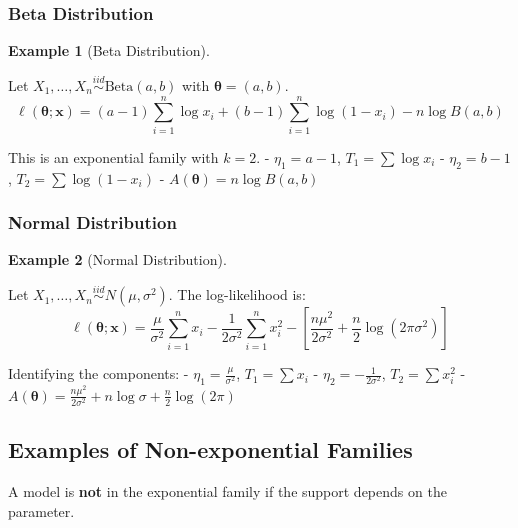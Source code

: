 \documentclass[
  letterpaper,
  DIV=11,
  numbers=noendperiod]{scrreprt}
\renewcommand{\[}{\begin{equation}}
\renewcommand{\]}{\end{equation}}
\theoremstyle{definition}
\theoremstyle{plain}
\theoremstyle{plain}
\theoremstyle{plain}
\theoremstyle{definition}
\newtheorem{example}{Example}[chapter]
\theoremstyle{plain}
\theoremstyle{remark}
\begin{document}
\subsubsection*{Beta Distribution}\label{beta-distribution}

\begin{example}[Beta
Distribution]\protect\hypertarget{exm-beta-dist}{}\label{exm-beta-dist}

Let \(X_1, \dots, X_n \overset{iid}{\sim} \text{Beta}(a, b)\) with
\(\boldsymbol{\theta} = (a, b)\). \[
\ell(\boldsymbol{\theta}; \mathbf{x}) = (a-1) \sum_{i=1}^n \log x_i + (b-1) \sum_{i=1}^n \log(1-x_i) - n \log B(a, b)
\]

This is an exponential family with \(k=2\). - \(\eta_1 = a-1\),
\(T_1 = \sum \log x_i\) - \(\eta_2 = b-1\), \(T_2 = \sum \log(1-x_i)\) -
\(A(\boldsymbol{\theta}) = n \log B(a, b)\)

\end{example}

\subsubsection*{Normal Distribution}\label{normal-distribution}

\begin{example}[Normal
Distribution]\protect\hypertarget{exm-normal-dist}{}\label{exm-normal-dist}

Let \(X_1, \dots, X_n \overset{iid}{\sim} N(\mu, \sigma^2)\). The
log-likelihood is: \[
\ell(\boldsymbol{\theta}; \mathbf{x}) = \frac{\mu}{\sigma^2} \sum_{i=1}^n x_i - \frac{1}{2\sigma^2} \sum_{i=1}^n x_i^2 - \left[ \frac{n\mu^2}{2\sigma^2} + \frac{n}{2} \log(2\pi\sigma^2) \right]
\]

Identifying the components: - \(\eta_1 = \frac{\mu}{\sigma^2}\),
\(T_1 = \sum x_i\) - \(\eta_2 = -\frac{1}{2\sigma^2}\),
\(T_2 = \sum x_i^2\) -
\(A(\boldsymbol{\theta}) = \frac{n\mu^2}{2\sigma^2} + n \log \sigma + \frac{n}{2} \log(2\pi)\)

\end{example}

\subsection{Examples of Non-exponential
Families}\label{examples-of-non-exponential-families}

A model is \textbf{not} in the exponential family if the support depends
on the parameter.
\end{document}
